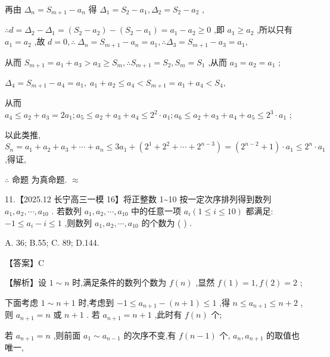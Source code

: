 \documentclass[10pt]{article}
\newcommand*\circled[1]{\tikz[baseline=(char.base)]{\node[shape=circle,draw,inner sep=1.5pt] (char) {\small #1};}}
\begin{document}
再由 \({\Delta }_{n} = {S}_{m + 1} - {a}_{n}\) 得 \({\Delta }_{1} = {S}_{2} - {a}_{1},{\Delta }_{2} = {S}_{2} - {a}_{2}\) ,

\(\therefore d = {\Delta }_{2} - {\Delta }_{1} = \left( {{S}_{2} - {a}_{2}}\right)  - \left( {{S}_{2} - {a}_{1}}\right)  = {a}_{1} - {a}_{2} \geq  0\) ,即 \({a}_{1} \geq  {a}_{2}\) ,所以只有 \({a}_{1} = {a}_{2}\) ,故 \(d = 0,\therefore \; {\Delta }_{n} = {S}_{m + 1} - {a}_{n} = {a}_{1},\therefore {\Delta }_{3} = {S}_{m + 1} - {a}_{3} = {a}_{1},\)

从而 \({S}_{m + 1} = {a}_{1} + {a}_{3} > {a}_{3} \geq  {S}_{m},\therefore {S}_{m + 1} = {S}_{2},{S}_{m} = {S}_{1}\) ,从而 \({a}_{3} = {a}_{2} = {a}_{1}\) ;

\({\Delta }_{4} = {S}_{m + 1} - {a}_{4} = {a}_{1},\;{a}_{1} + {a}_{2} \leq  {a}_{4} < {S}_{m + 1} = {a}_{1} + {a}_{4} < {S}_{4},\)

从而 \({a}_{4} \leq  {a}_{2} + {a}_{3} = 2{a}_{1};{a}_{5} \leq  {a}_{2} + {a}_{3} + {a}_{4} \leq  {2}^{2} \cdot  {a}_{1};{a}_{6} \leq  {a}_{2} + {a}_{3} + {a}_{4} + {a}_{5} \leq  {2}^{3} \cdot  {a}_{1}\) ;

以此类推, \({S}_{n} = {a}_{1} + {a}_{2} + {a}_{3} + \cdots  + {a}_{n} \leq  3{a}_{1} + \left( {{2}^{1} + {2}^{2} + \cdots  + {2}^{n - 3}}\right)  = \left( {{2}^{n - 2} + 1}\right)  \cdot  {a}_{1} \leq  {2}^{n} \cdot  {a}_{1}\) ,得证,

\(\therefore\) 命题 \circled{2} 为真命题. \(\approx\)

11.【2025.12 长宁高三一模 16】将正整数 1\textasciitilde 10 按一定次序排列得到数列 \({a}_{1},{a}_{2},\cdots ,{a}_{10}\) . 若数列 \({a}_{1},{a}_{2},\cdots ,{a}_{10}\) 中的任意一项 \({a}_{i}\left( {1 \leq  i \leq  {10}}\right)\) 都满足: \(- 1 \leq  {a}_{i} - i \leq  1\) ,则数列 \({a}_{1},{a}_{2},\cdots ,{a}_{10}\) 的个数为 ( ) .

A. 36; B.55; C. 89; D.144.

【答案】C

【解析】设 \(1 \sim  n\) 时,满足条件的数列个数为 \(f\left( n\right)\) ,显然 \(f\left( 1\right)  = 1,f\left( 2\right)  = 2\) ;

下面考虑 \(1 \sim  n + 1\) 时,考虑到 \(- 1 \leq  {a}_{n + 1} - \left( {n + 1}\right)  \leq  1\) ,得 \(n \leq  {a}_{n + 1} \leq  n + 2\) ,则 \({a}_{n + 1} = n\) 或 \(n + 1\) . 若 \({a}_{n + 1} = n + 1\) ,此时有 \(f\left( n\right)\) 个;

若 \({a}_{n + 1} = n\) ,则前面 \({a}_{1} \sim  {a}_{n - 1}\) 的次序不变,有 \(f\left( {n - 1}\right)\) 个, \({a}_{n},{a}_{n + 1}\) 的取值也唯一,
\end{document}
